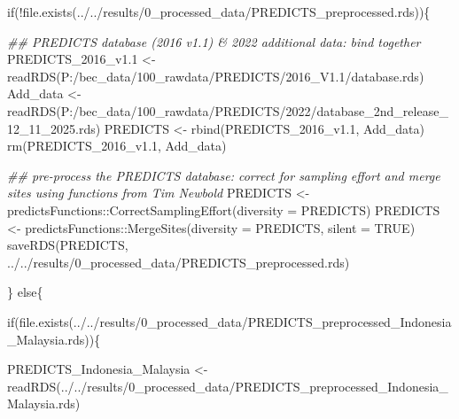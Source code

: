 \documentclass[
  letterpaper,
  DIV=11,
  numbers=noendperiod]{scrartcl}
\newenvironment{Shaded}{\begin{snugshade}}{\end{snugshade}}
\newcommand{\AttributeTok}[1]{\textcolor[rgb]{0.40,0.45,0.13}{#1}}
\newcommand{\ConstantTok}[1]{\textcolor[rgb]{0.56,0.35,0.01}{#1}}
\newcommand{\ControlFlowTok}[1]{\textcolor[rgb]{0.00,0.23,0.31}{#1}}
\newcommand{\DocumentationTok}[1]{\textcolor[rgb]{0.37,0.37,0.37}{\textit{#1}}}
\newcommand{\FloatTok}[1]{\textcolor[rgb]{0.68,0.00,0.00}{#1}}
\newcommand{\FunctionTok}[1]{\textcolor[rgb]{0.28,0.35,0.67}{#1}}
\newcommand{\NormalTok}[1]{\textcolor[rgb]{0.00,0.23,0.31}{#1}}
\newcommand{\OtherTok}[1]{\textcolor[rgb]{0.00,0.23,0.31}{#1}}
\newcommand{\SpecialCharTok}[1]{\textcolor[rgb]{0.37,0.37,0.37}{#1}}
\newcommand{\StringTok}[1]{\textcolor[rgb]{0.13,0.47,0.30}{#1}}
\begin{document}
\begin{Shaded}
\begin{Highlighting}[]
\ControlFlowTok{if}\NormalTok{(}\SpecialCharTok{!}\FunctionTok{file.exists}\NormalTok{(}\StringTok{\textquotesingle{}../../results/0\_processed\_data/PREDICTS\_preprocessed.rds\textquotesingle{}}\NormalTok{))\{}

  \DocumentationTok{\#\# PREDICTS database (2016 v1.1) \& 2022 additional data: bind together}
\NormalTok{  PREDICTS\_2016\_v1}\FloatTok{.1} \OtherTok{\textless{}{-}} \FunctionTok{readRDS}\NormalTok{(}\StringTok{\textquotesingle{}P:/bec\_data/100\_rawdata/PREDICTS/2016\_V1.1/database.rds\textquotesingle{}}\NormalTok{)}
\NormalTok{  Add\_data }\OtherTok{\textless{}{-}} \FunctionTok{readRDS}\NormalTok{(}\StringTok{\textquotesingle{}P:/bec\_data/100\_rawdata/PREDICTS/2022/database\_2nd\_release\_12\_11\_2025.rds\textquotesingle{}}\NormalTok{)}
\NormalTok{  PREDICTS }\OtherTok{\textless{}{-}} \FunctionTok{rbind}\NormalTok{(PREDICTS\_2016\_v1}\FloatTok{.1}\NormalTok{, Add\_data)}
  \FunctionTok{rm}\NormalTok{(PREDICTS\_2016\_v1}\FloatTok{.1}\NormalTok{, Add\_data)}
  
  \DocumentationTok{\#\# pre{-}process the PREDICTS database: correct for sampling effort and merge sites using functions from Tim Newbold}
\NormalTok{  PREDICTS }\OtherTok{\textless{}{-}}\NormalTok{ predictsFunctions}\SpecialCharTok{::}\FunctionTok{CorrectSamplingEffort}\NormalTok{(}\AttributeTok{diversity =}\NormalTok{ PREDICTS)}
\NormalTok{  PREDICTS }\OtherTok{\textless{}{-}}\NormalTok{ predictsFunctions}\SpecialCharTok{::}\FunctionTok{MergeSites}\NormalTok{(}\AttributeTok{diversity =}\NormalTok{ PREDICTS, }\AttributeTok{silent =} \ConstantTok{TRUE}\NormalTok{)}
  \FunctionTok{saveRDS}\NormalTok{(PREDICTS, }\StringTok{\textquotesingle{}../../results/0\_processed\_data/PREDICTS\_preprocessed.rds\textquotesingle{}}\NormalTok{)}
  
\NormalTok{\} }\ControlFlowTok{else}\NormalTok{\{}
  
  \ControlFlowTok{if}\NormalTok{(}\FunctionTok{file.exists}\NormalTok{(}\StringTok{\textquotesingle{}../../results/0\_processed\_data/PREDICTS\_preprocessed\_Indonesia\_Malaysia.rds\textquotesingle{}}\NormalTok{))\{}
    
\NormalTok{    PREDICTS\_Indonesia\_Malaysia }\OtherTok{\textless{}{-}} \FunctionTok{readRDS}\NormalTok{(}\StringTok{\textquotesingle{}../../results/0\_processed\_data/PREDICTS\_preprocessed\_Indonesia\_Malaysia.rds\textquotesingle{}}\NormalTok{)}
    

\end{Highlighting}
\end{Shaded}
\end{document}
